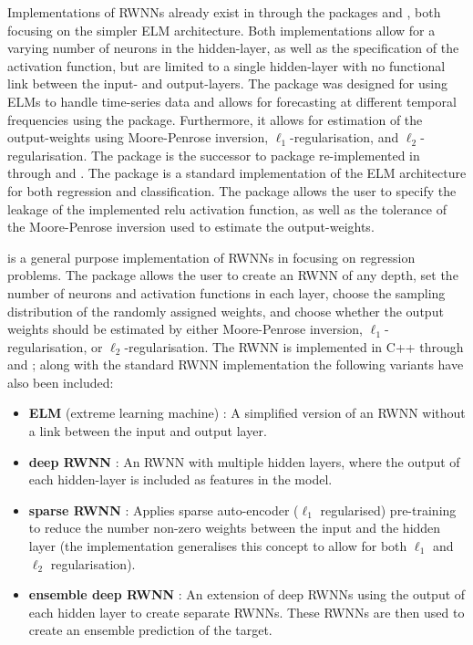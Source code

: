 \documentclass[
]{jss}
\providecommand{\tightlist}{%
  \setlength{\itemsep}{0pt}\setlength{\parskip}{0pt}}
\begin{document}
Implementations of RWNNs already exist in  through the
packages  \citep{nnfor} and 
\citep{elmNNRcpp}, both focusing on the simpler ELM architecture. Both
implementations allow for a varying number of neurons in the
hidden-layer, as well as the specification of the activation function,
but are limited to a single hidden-layer with no functional link between
the input- and output-layers. The  package was designed for
using ELMs to handle time-series data and allows for forecasting at
different temporal frequencies using the  package.
Furthermore, it allows for estimation of the output-weights using
Moore-Penrose inversion, \(\ell_1\)-regularisation, and
\(\ell_2\)-regularisation. The  package is the successor
to  package \citep{elmNN} re-implemented in 
through  and  \citep[\citet{RcppA}]{Rcpp}.
The package is a standard implementation of the ELM architecture for
both regression and classification. The package allows the user to
specify the leakage of the implemented relu activation function, as well
as the tolerance of the Moore-Penrose inversion used to estimate the
output-weights.

 is a general purpose implementation of RWNNs in 
\citep{R} focusing on regression problems. The  package allows
the user to create an RWNN of any depth, set the number of neurons and
activation functions in each layer, choose the sampling distribution of
the randomly assigned weights, and choose whether the output weights
should be estimated by either Moore-Penrose inversion,
\(\ell_1\)-regularisation, or \(\ell_2\)-regularisation. The RWNN is
implemented in C++ through  and ; along
with the standard RWNN implementation the following variants have also
been included:

\begin{itemize}
\tightlist
\item
  \textbf{ELM} (extreme learning machine) \citep{Huang2006}: A
  simplified version of an RWNN without a link between the input and
  output layer.
\item
  \textbf{deep RWNN} \citep{Henriquez2018}: An RWNN with multiple hidden
  layers, where the output of each hidden-layer is included as features
  in the model.
\item
  \textbf{sparse RWNN} \citep{Zhang2019}: Applies sparse auto-encoder
  (\(\ell_1\) regularised) pre-training to reduce the number non-zero
  weights between the input and the hidden layer (the implementation
  generalises this concept to allow for both \(\ell_1\) and \(\ell_2\)
  regularisation).
\item
  \textbf{ensemble deep RWNN} \citep{Shi2021}: An extension of deep
  RWNNs using the output of each hidden layer to create separate RWNNs.
  These RWNNs are then used to create an ensemble prediction of the
  target.
\end{itemize}
\end{document}

